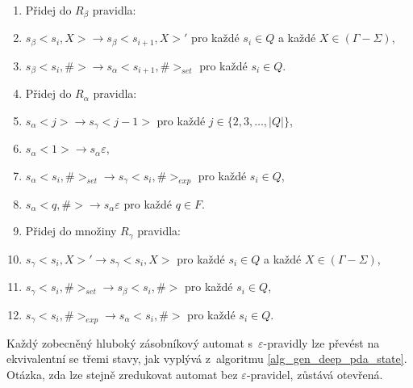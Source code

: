 \begin{Alg}
\begin{list}{}{\setlength\parsep{0cm} \setlength\itemsep{0cm} \setlength\leftmargin{1em}}
\begin{enumerate}

   \item Přidej do $R_\beta$ pravidla:

\renewcommand{\labelenumi}{(\roman{enumi})}

   \item $s_\beta <s_i, X> \rightarrow s_\beta <s_{i+1}, X>'$ pro každé $s_i \in Q$ a každé $X \in (\Gamma - \Sigma)$,
   \item $s_\beta <s_i, \#> \rightarrow s_\alpha <s_{i+1}, \#>_{set}$ pro každé $s_i \in Q$.


   \item Přidej do $R_\alpha$ pravidla:

\renewcommand{\labelenumi}{(\roman{enumi})}

   \item $s_\alpha <j> \rightarrow s_\gamma <j - 1 > $ pro každé $j \in \{2,3,\dots,|Q|\}$,
   \item $s_\alpha <1> \rightarrow s_\alpha \varepsilon $,
   \item $s_\alpha <s_i, \#>_{set} \rightarrow s_\gamma <s_{i}, \#>_{exp}$ pro každé $s_i \in Q$,
   \item $s_\alpha <q, \#> \rightarrow s_\alpha \varepsilon $ pro každé $q \in F$.


   \item Přidej do množiny $R_\gamma$ pravidla:

\renewcommand{\labelenumi}{(\roman{enumi})}

   \item $s_\gamma <s_i, X>' \rightarrow s_\gamma <s_i, X> $ pro každé $s_i \in Q$ a každé $X \in (\Gamma - \Sigma)$,
   \item $s_\gamma <s_i, \#>_{set} \rightarrow s_\beta <s_i, \#>$ pro každé $s_i \in Q$,
   \item $s_\gamma <s_i, \#>_{exp} \rightarrow s_\alpha <s_{i}, \#>$ pro každé $s_i \in Q$.

\end{enumerate}

\end{list}
\end{Alg}

Každý zobecněný hluboký zásobníkový automat s~$\varepsilon$-pravidly lze převést na ekvivalentní se třemi stavy, jak vyplývá z~algoritmu \ref{alg_gen_deep_pda_state}. Otázka, zda lze stejně zredukovat automat bez $\varepsilon$-pravidel, zůstává otevřená.

